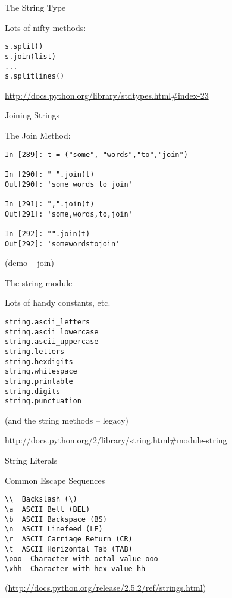 \documentclass{beamer}
\begin{document}
\begin{frame}[fragile]{The String Type}

{\Large Lots of nifty methods:}

\begin{verbatim}
s.split()
s.join(list)
...
s.splitlines()
\end{verbatim}

\url{http://docs.python.org/library/stdtypes.html#index-23}
\vfill

\end{frame} 

\begin{frame}[fragile]{Joining Strings}

{\Large The Join Method:}

\vfill
\begin{verbatim}
In [289]: t = ("some", "words","to","join")

In [290]: " ".join(t)
Out[290]: 'some words to join'

In [291]: ",".join(t)
Out[291]: 'some,words,to,join'

In [292]: "".join(t)
Out[292]: 'somewordstojoin'
\end{verbatim}

\vfill
(demo -- join)

\end{frame} 

\begin{frame}[fragile]{The string module}

{\Large Lots of handy constants, etc.}
\begin{verbatim}
string.ascii_letters
string.ascii_lowercase 
string.ascii_uppercase  
string.letters
string.hexdigits 
string.whitespace
string.printable
string.digits
string.punctuation      
\end{verbatim}

\vfill
(and the string methods -- legacy)

\vfill
{\small \url{http://docs.python.org/2/library/string.html#module-string} }
\end{frame} 

\begin{frame}[fragile]{String Literals}

{\Large Common Escape Sequences}
\vfill
\begin{verbatim}
\\  Backslash (\)   
\a  ASCII Bell (BEL)  
\b  ASCII Backspace (BS)  
\n  ASCII Linefeed (LF)   
\r  ASCII Carriage Return (CR)  
\t  ASCII Horizontal Tab (TAB)  
\ooo  Character with octal value ooo 
\xhh  Character with hex value hh
\end{verbatim}
(\url{http://docs.python.org/release/2.5.2/ref/strings.html})
\end{frame} 
\end{document}
